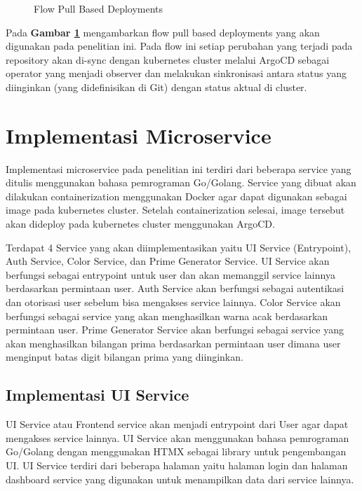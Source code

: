 \begin{figure}[H]
  \centering
  \caption{Flow Pull Based Deployments}
  \label{fig:flow_pull_based_deployments}
\end{figure}

Pada \textbf{Gambar \ref{fig:flow_pull_based_deployments}} mengambarkan flow
pull based deployments yang akan digunakan pada penelitian ini. Pada flow ini
setiap perubahan yang terjadi pada repository akan di-sync dengan kubernetes
cluster melalui ArgoCD sebagai operator yang menjadi observer dan melakukan
sinkronisasi antara status yang diinginkan (yang didefinisikan di Git) dengan
status aktual di cluster.

\section{Implementasi Microservice}\label{sec:bab4_implementasi_microservice}
Implementasi microservice pada penelitian ini terdiri dari beberapa service
yang ditulis menggunakan bahasa pemrograman Go/Golang. Service yang dibuat akan
dilakukan containerization menggunakan Docker agar dapat digunakan sebagai
image pada kubernetes cluster. Setelah containerization selesai, image tersebut
akan dideploy pada kubernetes cluster menggunakan ArgoCD.

Terdapat 4 Service yang akan diimplementasikan yaitu UI Service (Entrypoint),
Auth Service, Color Service, dan Prime Generator Service. UI Service akan
berfungsi sebagai entrypoint untuk user dan akan memanggil service lainnya
berdasarkan permintaan user. Auth Service akan berfungsi sebagai autentikasi
dan otorisasi user sebelum bisa mengakses service lainnya. Color Service akan
berfungsi sebagai service yang akan menghasilkan warna acak berdasarkan
permintaan user. Prime Generator Service akan berfungsi sebagai service yang
akan menghasilkan bilangan prima berdasarkan permintaan user dimana user
menginput batas digit bilangan prima yang diinginkan.

\subsection{Implementasi UI Service}
UI Service atau Frontend service akan menjadi entrypoint dari User agar dapat
mengakses service lainnya. UI Service akan menggunakan bahasa pemrograman
Go/Golang dengan menggunakan HTMX sebagai library untuk pengembangan UI. UI
Service terdiri dari beberapa halaman yaitu halaman login dan halaman dashboard
service yang digunakan untuk menampilkan data dari service lainnya.

